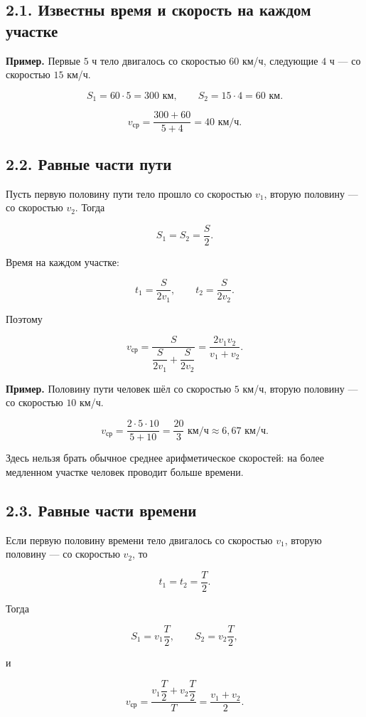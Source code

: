 \documentclass[a4paper,12pt]{article}
\begin{document}
\subsection*{2.1. Известны время и скорость на каждом участке}

\textbf{Пример.}
Первые $5$ ч тело двигалось со скоростью $60$ км/ч, следующие $4$ ч --- со скоростью $15$ км/ч.

\[
S_1=60\cdot5=300\text{ км},
\qquad
S_2=15\cdot4=60\text{ км}.
\]

\[
v_{\text{ср}}=
\frac{300+60}{5+4}
=40\text{ км/ч}.
\]

\subsection*{2.2. Равные части пути}

Пусть первую половину пути тело прошло со скоростью $v_1$, вторую половину --- со скоростью $v_2$. Тогда

\[
S_1=S_2=\frac{S}{2}.
\]

Время на каждом участке:

\[
t_1=\frac{S}{2v_1},
\qquad
t_2=\frac{S}{2v_2}.
\]

Поэтому

\[
v_{\text{ср}}=
\frac{S}{\dfrac{S}{2v_1}+\dfrac{S}{2v_2}}
=\boxed{\frac{2v_1v_2}{v_1+v_2}}.
\]

\textbf{Пример.}
Половину пути человек шёл со скоростью $5$ км/ч, вторую половину --- со скоростью $10$ км/ч.

\[
v_{\text{ср}}=
\frac{2\cdot5\cdot10}{5+10}
=\frac{20}{3}\text{ км/ч}
\approx6{,}67\text{ км/ч}.
\]

Здесь нельзя брать обычное среднее арифметическое скоростей: на более медленном участке человек проводит больше времени.

\subsection*{2.3. Равные части времени}

Если первую половину времени тело двигалось со скоростью $v_1$, вторую половину --- со скоростью $v_2$, то

\[
t_1=t_2=\frac{T}{2}.
\]

Тогда

\[
S_1=v_1\frac{T}{2},
\qquad
S_2=v_2\frac{T}{2},
\]

и

\[
v_{\text{ср}}=
\frac{v_1\dfrac{T}{2}+v_2\dfrac{T}{2}}{T}
=\boxed{\frac{v_1+v_2}{2}}.
\]
\end{document}
